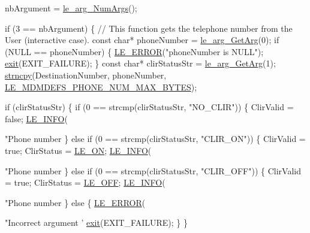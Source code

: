 \begin{DoxyCodeInclude}
{{{{{{    nbArgument = \hyperlink{le__args_8h_a6fbbeb423104e6eb92fe47ef42b7310a}{le\_arg\_NumArgs}();

    \textcolor{keywordflow}{if} (3 == nbArgument)
    \{
        \textcolor{comment}{// This function gets the telephone number from the User (interactive case).}
        \textcolor{keyword}{const} \textcolor{keywordtype}{char}* phoneNumber = \hyperlink{le__args_8h_a5ebca8229facd069785639cb3c1e273a}{le\_arg\_GetArg}(0);
        \textcolor{keywordflow}{if} (NULL == phoneNumber)
        \{
            \hyperlink{le__log_8h_a353590f91b3143a7ba3a416ae5a50c3d}{LE\_ERROR}(\textcolor{stringliteral}{"phoneNumber is NULL"});
            \hyperlink{app_stop_client_8c_a310220604a584e112ba8f7aa3dfe23f1}{exit}(EXIT\_FAILURE);
        \}
        \textcolor{keyword}{const} \textcolor{keywordtype}{char}* clirStatusStr = \hyperlink{le__args_8h_a5ebca8229facd069785639cb3c1e273a}{le\_arg\_GetArg}(1);
        \hyperlink{app_stop_client_8c_a748fa753ce7d07eed585f0c09823cb76}{strncpy}(DestinationNumber, phoneNumber, 
      \hyperlink{le__mdm_defs__interface_8h_ae6d4a4c7892f14d1e340f8df083d479f}{LE\_MDMDEFS\_PHONE\_NUM\_MAX\_BYTES});

        \textcolor{keywordflow}{if} (clirStatusStr)
        \{
           \textcolor{keywordflow}{if} (0 == strcmp(clirStatusStr, \textcolor{stringliteral}{"NO\_CLIR"}))
           \{
               ClirValid = \textcolor{keyword}{false};
               \hyperlink{le__log_8h_a23e6d206faa64f612045d688cdde5808}{LE\_INFO}(\textcolor{stringliteral}{"Phone number %
           \}
           \textcolor{keywordflow}{else} \textcolor{keywordflow}{if} (0 == strcmp(clirStatusStr, \textcolor{stringliteral}{"CLIR\_ON"}))
           \{
               ClirValid = \textcolor{keyword}{true};
               ClirStatus = \hyperlink{le__basics_8h_ae2138c90c41d30e2d510be01d8b374daa73623e8b9450d62517b467b9be2afce8}{LE\_ON};
               \hyperlink{le__log_8h_a23e6d206faa64f612045d688cdde5808}{LE\_INFO}(\textcolor{stringliteral}{"Phone number %
           \}
           \textcolor{keywordflow}{else} \textcolor{keywordflow}{if} (0 == strcmp(clirStatusStr, \textcolor{stringliteral}{"CLIR\_OFF"}))
           \{
               ClirValid = \textcolor{keyword}{true};
               ClirStatus = \hyperlink{le__basics_8h_ae2138c90c41d30e2d510be01d8b374daa66236546b5af0328d2db0e6970f67e50}{LE\_OFF};
               \hyperlink{le__log_8h_a23e6d206faa64f612045d688cdde5808}{LE\_INFO}(\textcolor{stringliteral}{"Phone number %
           \}
           \textcolor{keywordflow}{else}
           \{
               \hyperlink{le__log_8h_a353590f91b3143a7ba3a416ae5a50c3d}{LE\_ERROR}(\textcolor{stringliteral}{"Incorrect argument '%
               \hyperlink{app_stop_client_8c_a310220604a584e112ba8f7aa3dfe23f1}{exit}(EXIT\_FAILURE);
           \}
        \}

}}}}}}}}}}
\end{DoxyCodeInclude}
